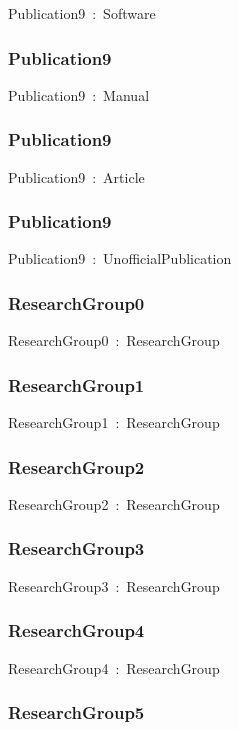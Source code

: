 \documentclass{article}
\begin{document}
Publication9~:~Software

\subsubsection*{Publication9}

Publication9~:~Manual

\subsubsection*{Publication9}

Publication9~:~Article

\subsubsection*{Publication9}

Publication9~:~UnofficialPublication

\subsubsection*{ResearchGroup0}

ResearchGroup0~:~ResearchGroup

\subsubsection*{ResearchGroup1}

ResearchGroup1~:~ResearchGroup

\subsubsection*{ResearchGroup2}

ResearchGroup2~:~ResearchGroup

\subsubsection*{ResearchGroup3}

ResearchGroup3~:~ResearchGroup

\subsubsection*{ResearchGroup4}

ResearchGroup4~:~ResearchGroup

\subsubsection*{ResearchGroup5}
\end{document}

